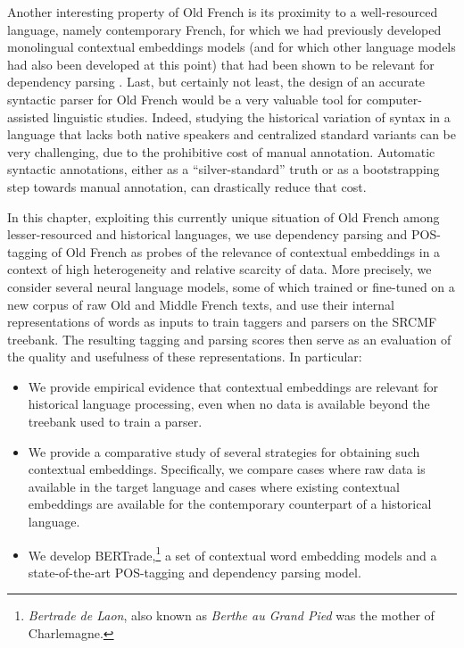 Another interesting property of Old French is its proximity to a well-resourced language, namely contemporary French, for which we had previously developed monolingual contextual embeddings models (and for which other language models had also been developed at this point) that had been shown to be relevant for dependency parsing \citep{martin-etal-2020-camembert,le-etal-2020-flaubert}. Last, but certainly not least, the design of an accurate syntactic parser for Old French would be a very valuable tool for computer-assisted linguistic studies. Indeed, studying the historical variation of syntax in a language that lacks both native speakers and centralized standard variants can be very challenging, due to the prohibitive cost of manual annotation. Automatic syntactic annotations, either as a \enquote{silver-standard} truth or as a bootstrapping step towards manual annotation, can drastically reduce that cost.

In this chapter, exploiting this currently unique situation of Old French among lesser-resourced and historical languages, we use dependency parsing and POS-tagging of Old French as probes of the relevance of contextual embeddings in a context of high heterogeneity and relative scarcity of data. More precisely, we consider several neural language models, some of which trained or fine-tuned on a new corpus of raw Old and Middle French texts, and use their internal representations of words as inputs to train taggers and parsers on the SRCMF treebank. The resulting tagging and parsing scores then serve as an evaluation of the quality and usefulness of these representations. In particular:

\begin{itemize}
    \item We provide empirical evidence that contextual embeddings are relevant for historical language processing, even when no data is available beyond the treebank used to train a parser.
    \item We provide a comparative study of several strategies for obtaining such contextual embeddings. Specifically, we compare cases where raw data is available in the target language and cases where existing contextual embeddings are available for the contemporary counterpart of a historical language.
    \item We develop BERTrade,\footnote{\emph{Bertrade de Laon}, also known as \emph{Berthe au Grand Pied} was the mother of Charlemagne.} a set of contextual word embedding models and a state-of-the-art POS-tagging and dependency parsing model.
\end{itemize}

